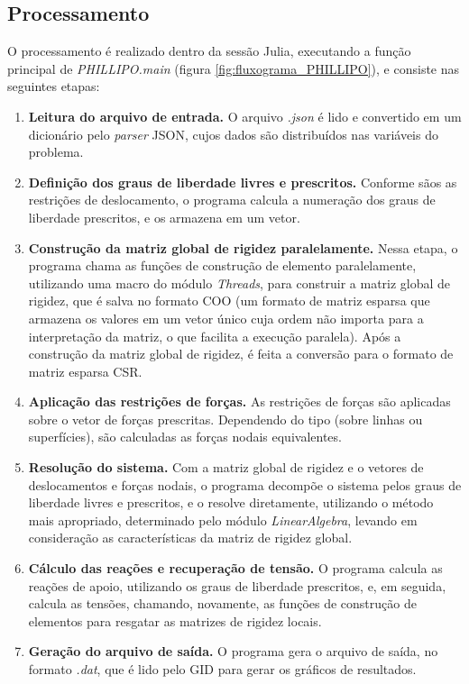 \subsection{Processamento}

O processamento é realizado dentro da sessão Julia, executando a função principal de \emph{PHILLIPO.main} (figura \ref{fig:fluxograma_PHILLIPO}), e consiste nas seguintes etapas:
\begin{enumerate}
    \item \textbf{Leitura do arquivo de entrada.} O arquivo \emph{.json} é lido e convertido em um dicionário pelo \emph{parser} JSON, cujos dados são distribuídos nas variáveis do problema.
    \item \textbf{Definição dos graus de liberdade livres e prescritos.} Conforme sãos as restrições de deslocamento, o programa calcula a numeração dos graus de liberdade prescritos, e os armazena em um vetor.
    \item \textbf{Construção da matriz global de rigidez paralelamente.} Nessa etapa, o programa chama as funções de construção de elemento paralelamente, utilizando uma macro do módulo \emph{Threads}, para construir a matriz global de rigidez, que é salva no formato COO (um formato de matriz esparsa que armazena os valores em um vetor único cuja ordem não importa para a interpretação da matriz, o que facilita a execução paralela). Após a construção da matriz global de rigidez, é feita a conversão para o formato de matriz esparsa CSR. 
    \item \textbf{Aplicação das restrições de forças.} As restrições de forças são aplicadas sobre o vetor de forças prescritas. Dependendo do tipo (sobre linhas ou superfícies), são calculadas as forças nodais equivalentes.
    \item \textbf{Resolução do sistema.} Com a matriz global de rigidez e o vetores de deslocamentos e forças nodais, o programa decompõe o sistema pelos graus de liberdade livres e prescritos, e o resolve diretamente, utilizando o método mais apropriado, determinado pelo módulo \emph{LinearAlgebra}, levando em consideração as características da matriz de rigidez global.
    \item \textbf{Cálculo das reações e recuperação de tensão.} O programa calcula as reações de apoio, utilizando os graus de liberdade prescritos, e, em seguida, calcula as tensões, chamando, novamente, as funções de construção de elementos para resgatar as matrizes de rigidez locais.
    \item \textbf{Geração do arquivo de saída.} O programa gera o arquivo de saída, no formato \emph{.dat}, que é lido pelo GID para gerar os gráficos de resultados.

\end{enumerate}

